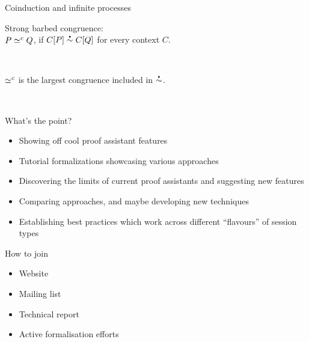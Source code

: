\documentclass[aspectratio=169,hyperref={pdfpagelabels=false}]{beamer}
\begin{document}
\begin{frame}{Coinduction and infinite processes}

Strong barbed congruence:\\  
\textrm{
  \( P \simeq^c Q \), if \( \sbbisim{\applyctx{C}{P}}{\applyctx{C}{Q}} \) for every context \( C \).}

\ \\
\begin{lemma}
  \( \simeq^c \) is the largest congruence included in
  \( \sbbisim{}{} \).
\end{lemma}


\ \\




\end{frame}

\begin{frame}{What's the point?}
  \begin{itemize}
  \item Showing off cool proof assistant features
  \item Tutorial formalizations showcasing various approaches
  \item Discovering the limits of current proof assistants and suggesting new features
  \item Comparing approaches, and maybe developing new techniques
  \item Establishing best practices which work across different ``flavours'' of session types
  \end{itemize}
\end{frame}

\begin{frame}{How to join}
  \begin{itemize}
  \item Website
  \item Mailing list
  \item Technical report
  \item Active formalisation efforts
  \end{itemize}
\end{frame}
\end{document}
